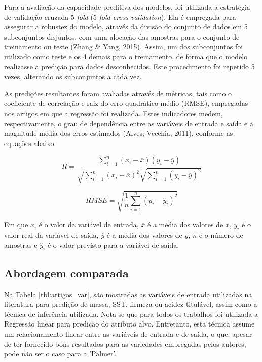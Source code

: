 
Para a avaliação da capacidade preditiva dos modelos, foi utilizada a estratégia de validação cruzada 5-\textit{fold} (5-\textit{fold cross validation}). Ela é empregada para assegurar a robustez do modelo, através da divisão do conjunto de dados em 5 subconjuntos disjuntos, com uma alocação das amostras para o conjunto de treinamento ou teste (Zhang & Yang, 2015). Assim, um dos subconjuntos foi utilizado como teste e os 4 demais para o treinamento, de forma que o modelo realizasse a predição para dados desconhecidos. Este procedimento foi repetido 5 vezes, alterando os subconjuntos a cada vez.

As predições resultantes foram avaliadas através de métricas, tais como o coeficiente de correlação e raiz do erro quadrático médio (RMSE), empregadas nos artigos em que a regressão foi realizada. Estes indicadores medem, respectivamente, o grau de dependência entre as variáveis de entrada e saída e a magnitude média dos erros estimados (Alves; Vecchia, 2011), conforme as equações abaixo:

\begin{equation} \label{eq:r}
	R = \frac{\sum_{i=1}^n (x_i - \overline{x})(y_i - \overline{y})}{\sqrt{\sum_{i=1}^n(x_i - \overline{x})^2} \sqrt{\sum_{i=1}^n (y_i - \overline{y})^2}}
\end{equation}

\begin{equation} \label{eq:rmse}
	RMSE = \sqrt{\frac{1}{n} \sum_{i=1}^n (y_i - \hat{y}_i)^2}
\end{equation}

Em que $x_i$ é o valor da variável de entrada, $\overline{x}$ é a média dos valores de $x$, $y_i$ é o valor real da variável de saída, $\overline{y}$ é a média dos valores de $y$, $n$ é o número de amostras e $\hat{y}_i$ é o valor previsto para a variável de saída.

\subsection{Abordagem comparada}

Na Tabela \ref{tbl:artigos_var}, são mostradas as variáveis de entrada utilizadas na literatura para predição de massa, SST, firmeza ou acidez titulável, assim como a técnica de inferência utilizada. Nota-se que para todos os trabalhos foi utilizada a Regressão linear para predição do atributo alvo. Entretanto, esta técnica assume um relacionamento linear entre as variáveis de entrada e de saída, o que, apesar de ter fornecido bons resultados para as variedades empregadas pelos autores, pode não ser o caso para a 'Palmer'.

